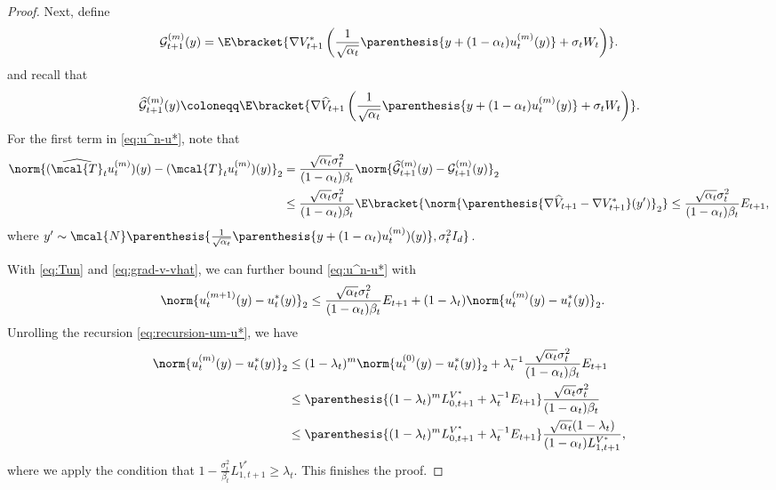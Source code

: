 \documentclass{article}
\begin{document}
\begin{proof}
Next, define
\begin{align*}
    \mathcal{G}_{t+1}^{(m)}(y) = \E\bracket{\nabla V_{t+1}^{*}\left(\frac{1}{\sqrt{\alpha_t}}\parenthesis{y + (1 - \alpha_t)u_t^{(m)}(y)} + \sigma_t W_t\right)}.
\end{align*}
and recall that
\begin{align*}
    \widehat{\mathcal{G}}_{t+1}^{(m)}(y)  \coloneqq \E\bracket{\nabla \widehat{V}_{t+1}\left(\frac{1}{\sqrt{\alpha_t}}\parenthesis{y + (1 - \alpha_t)u_t^{(m)}(y)} + \sigma_t W_t\right)}.
\end{align*}
For the first term in \eqref{eq:u^n-u*}, note that 
\begin{align}
    \norm{(\widehat{\mcal{T}}_t u_t^{(m)})(y) - (\mcal{T}_{t}u_t^{(m)})(y)}_{2} & = \frac{\sqrt{\alpha_{t}}\sigma_{t}^{2}}{(1 - \alpha_{t})\beta_t}\norm{\widehat{\mathcal{G}}_{t+1}^{(m)}(y) - \mathcal{G}_{t+1}^{(m)}(y)}_{2} \nonumber \\ & \leq \frac{\sqrt{\alpha_{t}}\sigma_{t}^{2}}{(1 - \alpha_{t})\beta_t}\E\bracket{\norm{\parenthesis{\nabla \widehat{V}_{t+1} - \nabla V^{*}_{t+1}}(y')}_{2}} \leq \frac{\sqrt{\alpha_{t}}\sigma_{t}^{2}}{(1 - \alpha_{t})\beta_t}E_{t+1},  \label{eq:grad-v-vhat}
\end{align}
where $ y' \sim \mcal{N}\parenthesis{\frac{1}{\sqrt{\alpha_t}}\parenthesis{y + (1 - \alpha_t)u_t^{(m)})(y)}, \sigma_t^2 I_d} $. 

With \eqref{eq:Tun} and \eqref{eq:grad-v-vhat}, we can further bound \eqref{eq:u^n-u*} with
\begin{align}
    \norm{u_{t}^{(m+1)}(y) - u_{t}^{*}(y)}_{2} & \leq \frac{\sqrt{\alpha_{t}}\sigma_{t}^{2}}{(1 - \alpha_{t})\beta_t}E_{t+1} + (1 - \lambda_{t})\norm{u_{t}^{(m)}(y) - u_{t}^{*}(y)}_{2}. \label{eq:recursion-um-u*}
\end{align}
Unrolling the recursion \eqref{eq:recursion-um-u*}, we have
\begin{align*}
    \norm{u_{t}^{(m)}(y) - u_{t}^{*}(y)}_{2} & \leq (1 - \lambda_t)^m\norm{u_{t}^{(0)}(y) - u_{t}^{*}(y)}_{2} + \lambda_t^{-1}\frac{\sqrt{\alpha_{t}}\sigma_{t}^{2}}{(1 - \alpha_{t})\beta_t}E_{t+1} \\ & \leq \parenthesis{(1 - \lambda_t)^m L_{0,t+1}^{V^*} + \lambda_t^{-1}E_{t+1}} \frac{\sqrt{\alpha_{t}}\sigma_{t}^{2}}{(1 - \alpha_{t})\beta_t} \\ & \leq \parenthesis{(1 - \lambda_t)^m L_{0,t+1}^{V^*} + \lambda_t^{-1}E_{t+1}} \frac{\sqrt{\alpha_{t}}(1 - \lambda_t)}{(1 - \alpha_{t})L_{1, t+1}^{V^*}},
\end{align*}
where we apply the condition that $1 - \frac{\sigma_t^2}{\beta_t}L_{1, t+1}^{V^*} \geq \lambda_t$. This finishes the proof.
\end{proof}
\end{document}
